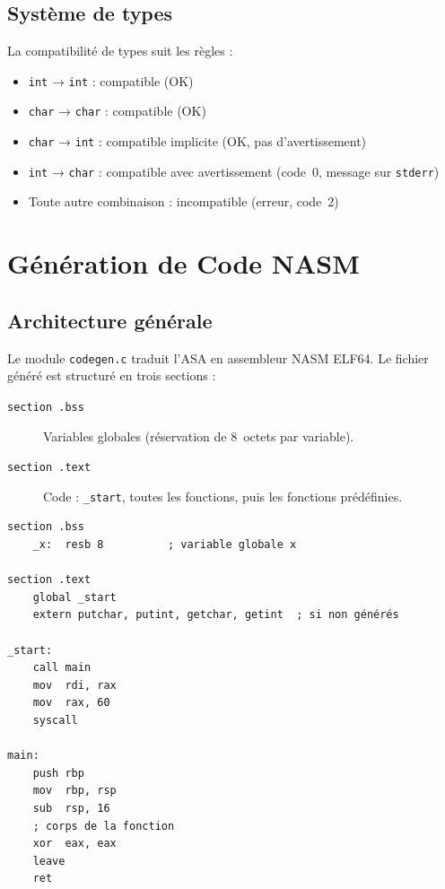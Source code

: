 \documentclass[12pt,a4paper]{article}
\newcommand{\nasm}{\textsc{NASM}}
\begin{document}
\subsection{Système de types}

La compatibilité de types suit les règles :

\begin{itemize}
  \item \texttt{int} → \texttt{int} : compatible (OK)
  \item \texttt{char} → \texttt{char} : compatible (OK)
  \item \texttt{char} → \texttt{int} : compatible implicite (OK, pas d'avertissement)
  \item \texttt{int} → \texttt{char} : compatible avec avertissement (code~0, message sur \texttt{stderr})
  \item Toute autre combinaison : incompatible (erreur, code~2)
\end{itemize}

\section{Génération de Code NASM}

\subsection{Architecture générale}

Le module \texttt{codegen.c} traduit l'ASA en assembleur \nasm{} ELF64.
Le fichier généré est structuré en trois sections :

\begin{description}
  \item[\texttt{section .bss}] Variables globales (réservation de 8~octets par variable).
  \item[\texttt{section .text}] Code : \texttt{\_start}, toutes les fonctions, puis les fonctions prédéfinies.
\end{description}

\begin{lstlisting}[language={[x86masm]Assembler}, caption={Structure d'un fichier .asm généré}]
section .bss
    _x:  resb 8          ; variable globale x

section .text
    global _start
    extern putchar, putint, getchar, getint  ; si non générés

_start:
    call main
    mov  rdi, rax
    mov  rax, 60
    syscall

main:
    push rbp
    mov  rbp, rsp
    sub  rsp, 16
    ; corps de la fonction
    xor  eax, eax
    leave
    ret
\end{lstlisting}
\end{document}
